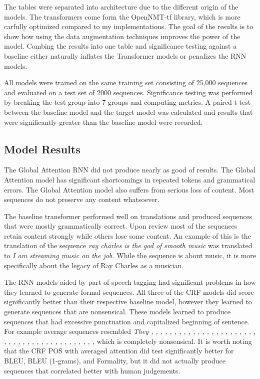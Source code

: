 \documentclass[12pt]{article}
\begin{document}
\par
The tables were separated into architecture due to the different origin of the models. The transformers come form the 
OpenNMT-tf library, which is more carfully optimized compared to my implementations. The goal
of the results is to show how using the data augmentation techniques improves the power of
the model. Combing the results into one table and significance testing against a baseline 
either naturally inflates the Transformer models or penalizes the RNN models. 

\par
All models were trained on the same training set consisting of 25,000 sequences and evaluated
on a test set of 2000 sequences. Significance testing was performed by breaking the test group
into 7 groups and computing metrics. A paired t-test between the baseline model and the 
target model was calculated and results that were significantly greater than the baseline model
were recorded. 


\subsection{Model Results}
\par
The Global Attention RNN did not produce nearly as 
good of results. The Global Attention model has significant shortcomings in 
repeated tokens and grammatical errors. The Global Attention model also suffers 
from serious loss of content. Most sequences do not preserve any content whatsoever. \par

The baseline transformer performed well on translations and produced sequences that were mostly
grammatically correct. Upon review most of the sequences retain content strongly while others 
lose some content. An example of this is the translation of the sequence \textit{ray charles is 
the god of smooth music} was translated to \textit{I am streaming music on the job.} While the sequence
is about music, it is more specifically about the legacy of Ray Charles as a musician.  \par

The RNN models aided by part of speech tagging had significant problems in how they learned 
to generate formal sequences. All three of the CRF models did score significantly better 
than their respective baseline model, however they learned to generate sequences that are
nonsensical. These models learned to produce sequences that had excessive punctuation and
capitalized beginning of sentence. For example average sequences resembled 
\textit{They , , , , , , , , , , , , , , , , , , , , , , , , , , , , , , , , , , , , , , , , , , ,}
which is completely nonsensical. It is worth noting that the CRF POS with averaged attention
did test significantly better for BLEU, BLEU (1-grams), and Formality, but it did not actually produce 
sequences that correlated better with human judgements. \par 
\end{document}
